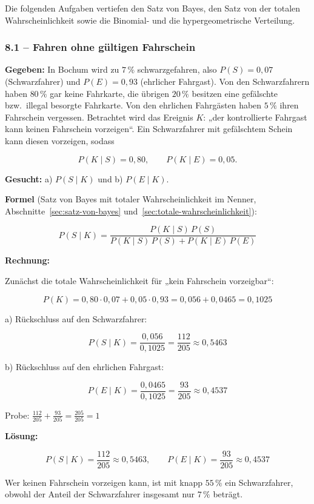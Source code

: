 Die folgenden Aufgaben vertiefen den Satz von Bayes, den Satz von der totalen
Wahrscheinlichkeit sowie die Binomial- und die hypergeometrische Verteilung.

\subsubsection*{8.1 – Fahren ohne gültigen Fahrschein}

\begin{beispiel}

\textbf{Gegeben:} In Bochum wird zu $7\,\%$ schwarzgefahren, also
$P(S) = 0{,}07$ (Schwarzfahrer) und $P(E) = 0{,}93$ (ehrlicher Fahrgast).
Von den Schwarzfahrern haben $80\,\%$ gar keine Fahrkarte, die übrigen
$20\,\%$ besitzen eine gefälschte bzw.\ illegal besorgte Fahrkarte. Von den
ehrlichen Fahrgästen haben $5\,\%$ ihren Fahrschein vergessen. Betrachtet wird
das Ereignis $K$: „der kontrollierte Fahrgast kann keinen Fahrschein
vorzeigen``. Ein Schwarzfahrer mit gefälschtem Schein kann diesen vorzeigen,
sodass

$$
P(K \mid S) = 0{,}80, \qquad P(K \mid E) = 0{,}05 .
$$

\textbf{Gesucht:} a) $P(S \mid K)$ und b) $P(E \mid K)$.

\textbf{Formel} (Satz von Bayes mit totaler Wahrscheinlichkeit im Nenner,
Abschnitte~\ref{sec:satz-von-bayes} und~\ref{sec:totale-wahrscheinlichkeit}):

$$
P(S \mid K) = \frac{P(K \mid S)\, P(S)}{P(K \mid S)\, P(S) + P(K \mid E)\, P(E)}
$$

\textbf{Rechnung:}

Zunächst die totale Wahrscheinlichkeit für „kein Fahrschein vorzeigbar``:

$$
P(K) = 0{,}80 \cdot 0{,}07 + 0{,}05 \cdot 0{,}93
     = 0{,}056 + 0{,}0465 = 0{,}1025
$$

a) Rückschluss auf den Schwarzfahrer:

$$
P(S \mid K) = \frac{0{,}056}{0{,}1025} = \frac{112}{205} \approx 0{,}5463
$$

b) Rückschluss auf den ehrlichen Fahrgast:

$$
P(E \mid K) = \frac{0{,}0465}{0{,}1025} = \frac{93}{205} \approx 0{,}4537
$$

Probe: $\tfrac{112}{205} + \tfrac{93}{205} = \tfrac{205}{205} = 1$ \checkmark

\textbf{Lösung:}

$$
\boxed{P(S \mid K) = \frac{112}{205} \approx 0{,}5463, \qquad
P(E \mid K) = \frac{93}{205} \approx 0{,}4537}
$$

Wer keinen Fahrschein vorzeigen kann, ist mit knapp $55\,\%$ ein Schwarzfahrer,
obwohl der Anteil der Schwarzfahrer insgesamt nur $7\,\%$ beträgt.

\end{beispiel}

